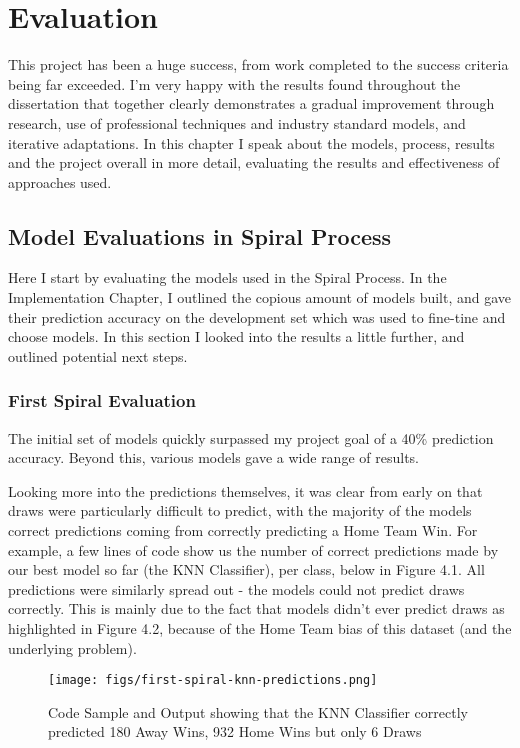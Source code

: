 \documentclass[12pt,a4paper,twoside,openright]{report}
\begin{document}
\chapter{Evaluation}

This project has been a huge success, from work completed to the success criteria being far exceeded. I'm very happy with the results found throughout the dissertation that together clearly demonstrates a gradual improvement through research, use of professional techniques and industry standard models, and iterative adaptations. In this chapter I speak about the models, process, results and the project overall in more detail, evaluating the results and effectiveness of approaches used.

\section{Model Evaluations in Spiral Process}

Here I start by evaluating the models used in the Spiral Process. In the Implementation Chapter, I outlined the copious amount of models built, and gave their prediction accuracy on the development set which was used to fine-tine and choose models. In this section I looked into the results a little further, and outlined potential next steps.

\subsection{First Spiral Evaluation}

The initial set of models quickly surpassed my project goal of a 40\% prediction accuracy. Beyond this, various models gave a wide range of results.

Looking more into the predictions themselves, it was clear from early on that draws were particularly difficult to predict, with the majority of the models correct predictions coming from correctly predicting a Home Team Win. For example, a few lines of code show us the number of correct predictions made by our best model so far (the KNN Classifier), per class, below in Figure 4.1. All predictions were similarly spread out - the models could not predict draws correctly. This is mainly due to the fact that models didn't ever predict draws as highlighted in Figure 4.2, because of the Home Team bias of this dataset (and the underlying problem).

\begin{figure}[h]
  \centering
  \texttt{[image: figs/first-spiral-knn-predictions.png]}
  \caption{Code Sample and Output showing that the KNN Classifier correctly predicted 180 Away Wins, 932 Home Wins but only 6 Draws}
  \label{fig:spiral1-knn}
\end{figure}
\end{document}
